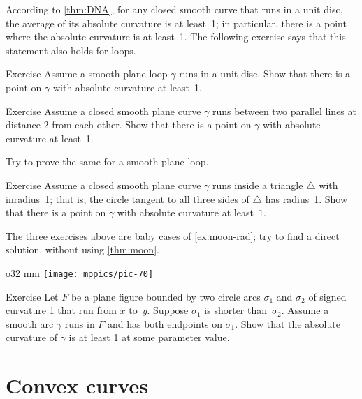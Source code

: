 According to \ref{thm:DNA}, for any closed smooth curve that runs in a unit disc, the average of its absolute curvature is at least~1; in particular, there is a point where the absolute curvature is at least~1.
The following exercise says that this statement also holds for loops.

\begin{thm}{Exercise}\label{ex:in-circle}
Assume a smooth plane loop $\gamma$ runs in a unit disc.
Show that there is a point on $\gamma$ with absolute curvature at least~1.
\end{thm}


\begin{thm}{Exercise}\label{ex:between-parallels-1}
Assume a closed smooth plane curve $\gamma$ runs between two parallel lines at distance 2 from each other.
Show that there is a point on $\gamma$ with absolute curvature at least~1.

Try to prove the same for a smooth plane loop.
\end{thm}

\begin{thm}{Exercise}\label{ex:in-triangle}
Assume a closed smooth plane curve $\gamma$ runs inside a triangle $\triangle$ with inradius~1; that is, the circle tangent to all three sides of $\triangle$ has radius~1. 
Show that there is a point on $\gamma$ with absolute curvature at least~$1$.
\end{thm}

The three exercises above are baby cases of \ref{ex:moon-rad}; try to find a direct solution, without using \ref{thm:moon}.

{

\begin{wrapfigure}{o}{32 mm}
\vskip-4mm
\centering
\texttt{[image: mppics/pic-70]}
\vskip0mm
\end{wrapfigure}

\begin{thm}{Exercise}\label{ex:lens}
Let $F$ be a plane figure bounded by two circle arcs $\sigma_1$ and $\sigma_2$ of signed curvature 1 that run from $x$ to~$y$.
Suppose $\sigma_1$ is shorter than~$\sigma_2$.
Assume a smooth arc $\gamma$ runs in $F$ and has both endpoints on $\sigma_1$.
Show that the absolute curvature of $\gamma$ is at least 1 at some parameter value.

\end{thm}

}

\section{Convex curves}

